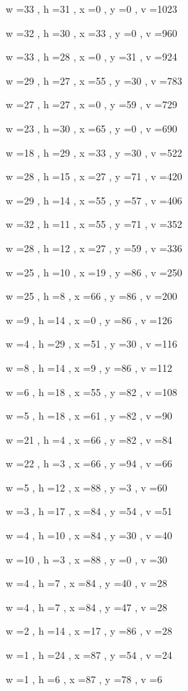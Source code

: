 \documentclass[11pt]{article}
\begin{document}
w =33 , h =31 , x =0 , y =0 , v =1023
\par
w =32 , h =30 , x =33 , y =0 , v =960
\par
w =33 , h =28 , x =0 , y =31 , v =924
\par
w =29 , h =27 , x =55 , y =30 , v =783
\par
w =27 , h =27 , x =0 , y =59 , v =729
\par
w =23 , h =30 , x =65 , y =0 , v =690
\par
w =18 , h =29 , x =33 , y =30 , v =522
\par
w =28 , h =15 , x =27 , y =71 , v =420
\par
w =29 , h =14 , x =55 , y =57 , v =406
\par
w =32 , h =11 , x =55 , y =71 , v =352
\par
w =28 , h =12 , x =27 , y =59 , v =336
\par
w =25 , h =10 , x =19 , y =86 , v =250
\par
w =25 , h =8 , x =66 , y =86 , v =200
\par
w =9 , h =14 , x =0 , y =86 , v =126
\par
w =4 , h =29 , x =51 , y =30 , v =116
\par
w =8 , h =14 , x =9 , y =86 , v =112
\par
w =6 , h =18 , x =55 , y =82 , v =108
\par
w =5 , h =18 , x =61 , y =82 , v =90
\par
w =21 , h =4 , x =66 , y =82 , v =84
\par
w =22 , h =3 , x =66 , y =94 , v =66
\par
w =5 , h =12 , x =88 , y =3 , v =60
\par
w =3 , h =17 , x =84 , y =54 , v =51
\par
w =4 , h =10 , x =84 , y =30 , v =40
\par
w =10 , h =3 , x =88 , y =0 , v =30
\par
w =4 , h =7 , x =84 , y =40 , v =28
\par
w =4 , h =7 , x =84 , y =47 , v =28
\par
w =2 , h =14 , x =17 , y =86 , v =28
\par
w =1 , h =24 , x =87 , y =54 , v =24
\par
w =1 , h =6 , x =87 , y =78 , v =6
\par
\newpage
\end{document}
